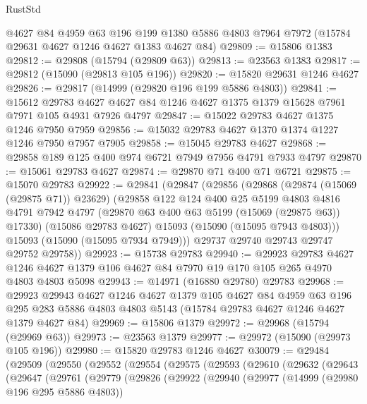 \begin{lexlean}{RustStd}
\begin{coremodule}
    @4627
    @84
    @4959
    @63
    @196
    @199
    @1380
    @5886
    @4803
    @7964
    @7972
    (@15784 @29631 @4627 @1246 @4627 @1383 @4627 @84)
@29809 := @15806 @1383
@29812 := @29808 (@15794 (@29809 @63))
@29813 := @23563 @1383
@29817 := @29812 (@15090 (@29813 @105 @196))
@29820 := @15820 @29631 @1246 @4627
@29826 := @29817 (@14999 (@29820 @196 @199 @5886 @4803))
@29841 := @15612
    @29783
    @4627
    @4627
    @84
    @1246
    @4627
    @1375
    @1379
    @15628
    @7961
    @7971
    @105
    @4931
    @7926
    @4797
@29847 := @15022 @29783 @4627 @1375 @1246 @7950 @7959
@29856 := @15032 @29783 @4627 @1370 @1374 @1227 @1246 @7950 @7957 @7905
@29858 := @15045 @29783 @4627
@29868 := @29858 @189 @125 @400 @974 @6721 @7949 @7956 @4791 @7933 @4797
@29870 := @15061 @29783 @4627
@29874 := @29870 @71 @400 @71 @6721
@29875 := @15070 @29783
@29922 := @29841
    (@29847
      (@29856
        (@29868
          (@29874 (@15069 (@29875 @71)) @23629)
          (@29858
            @122
            @124
            @400
            @25
            @5199
            @4803
            @4816
            @4791
            @7942
            @4797
            (@29870 @63 @400 @63 @5199 (@15069 (@29875 @63)) @17330)
            (@15086 @29783 @4627)
            @15093
            (@15090 (@15095 @7943 @4803)))
          @15093
          (@15090 (@15095 @7934 @7949)))
        @29737
        @29740
        @29743
        @29747
        @29752
        @29758))
@29923 := @15738 @29783
@29940 := @29923
    @29783
    @4627
    @1246
    @4627
    @1379
    @106
    @4627
    @84
    @7970
    @19
    @170
    @105
    @265
    @4970
    @4803
    @4803
    @5098
@29943 := @14971 (@16880 @29780) @29783
@29968 := @29923
    @29943
    @4627
    @1246
    @4627
    @1379
    @105
    @4627
    @84
    @4959
    @63
    @196
    @295
    @283
    @5886
    @4803
    @4803
    @5143
    (@15784 @29783 @4627 @1246 @4627 @1379 @4627 @84)
@29969 := @15806 @1379
@29972 := @29968 (@15794 (@29969 @63))
@29973 := @23563 @1379
@29977 := @29972 (@15090 (@29973 @105 @196))
@29980 := @15820 @29783 @1246 @4627
@30079 := @29484
    (@29509
      (@29550
        (@29552
          (@29554
            (@29575
              (@29593
                (@29610
                  (@29632
                    (@29643
                      (@29647
                        (@29761
                          (@29779
                            (@29826
                              (@29922
                                (@29940
                                  (@29977
                                    (@14999 (@29980 @196 @295 @5886 @4803))

\end{coremodule}
\end{lexlean}
